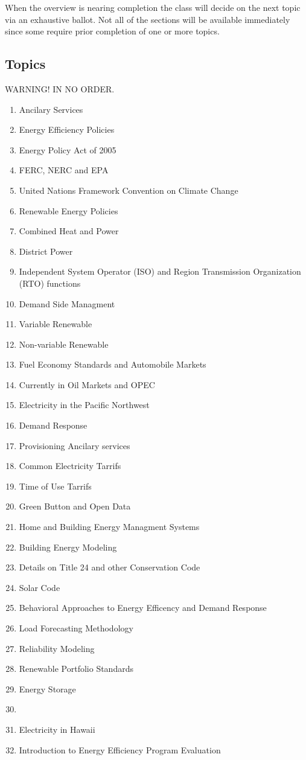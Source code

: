 \documentclass[letterpaper,10pt]{article}
\begin{document}
When the overview is nearing completion the class will decide on the next topic via an exhaustive ballot.  Not all of the sections will be available immediately since some require prior completion of one or more topics.

\subsection{Topics}
WARNING! IN NO ORDER.

\begin{enumerate}
  \item Ancilary Services
  \item Energy Efficiency Policies
  \item Energy Policy Act of 2005
  \item FERC, NERC and EPA
  \item United Nations Framework Convention on Climate Change
  \item Renewable Energy Policies
  \item Combined Heat and Power
  \item District Power
  \item Independent System Operator (ISO) and Region Transmission Organization (RTO) functions

  \item Demand Side Managment
  \item Variable Renewable
  \item Non-variable Renewable
  \item Fuel Economy Standards and Automobile Markets
  \item Currently in Oil Markets and OPEC
  \item Electricity in the Pacific Northwest
  \item Demand Response 
  \item Provisioning Ancilary services
  \item Common Electricity Tarrifs
  \item Time of Use Tarrifs
  \item Green Button and Open Data
  \item Home and Building Energy Managment Systems
  \item Building Energy Modeling
  \item Details on Title 24 and other Conservation Code
  \item Solar Code
  \item Behavioral Approaches to Energy Efficency and Demand Response
  \item Load Forecasting Methodology
  \item Reliability Modeling
  \item Renewable Portfolio Standards
  \item Energy Storage
  \item
  \item Electricity in Hawaii
  \item Introduction to Energy Efficiency Program Evaluation
\end{enumerate}
\end{document}
